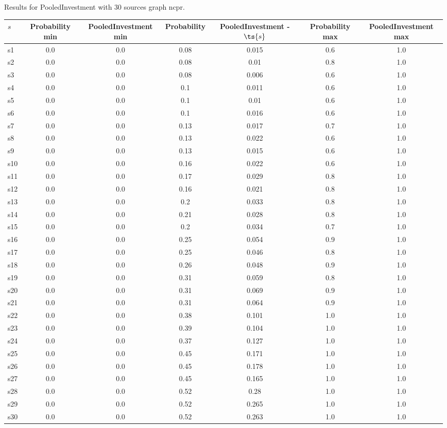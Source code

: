 \documentclass{article}
\begin{document}
\noindent Results for PooledInvestment with 30 sources graph ncpr.

\noindent\begin{tabular}{|l|c|c|c|c|c|c|}
\hline
$s$& Probability min & PooledInvestment min & Probability & PooledInvestment - $\ts{s}$ & Probability max & PooledInvestment max\\
\hline
s1 &0.0 & 0.0 & 0.08 & 0.015 & 0.6 & 1.0\\
\hline
s2 &0.0 & 0.0 & 0.08 & 0.01 & 0.8 & 1.0\\
\hline
s3 &0.0 & 0.0 & 0.08 & 0.006 & 0.6 & 1.0\\
\hline
s4 &0.0 & 0.0 & 0.1 & 0.011 & 0.6 & 1.0\\
\hline
s5 &0.0 & 0.0 & 0.1 & 0.01 & 0.6 & 1.0\\
\hline
s6 &0.0 & 0.0 & 0.1 & 0.016 & 0.6 & 1.0\\
\hline
s7 &0.0 & 0.0 & 0.13 & 0.017 & 0.7 & 1.0\\
\hline
s8 &0.0 & 0.0 & 0.13 & 0.022 & 0.6 & 1.0\\
\hline
s9 &0.0 & 0.0 & 0.13 & 0.015 & 0.6 & 1.0\\
\hline
s10 &0.0 & 0.0 & 0.16 & 0.022 & 0.6 & 1.0\\
\hline
s11 &0.0 & 0.0 & 0.17 & 0.029 & 0.8 & 1.0\\
\hline
s12 &0.0 & 0.0 & 0.16 & 0.021 & 0.8 & 1.0\\
\hline
s13 &0.0 & 0.0 & 0.2 & 0.033 & 0.8 & 1.0\\
\hline
s14 &0.0 & 0.0 & 0.21 & 0.028 & 0.8 & 1.0\\
\hline
s15 &0.0 & 0.0 & 0.2 & 0.034 & 0.7 & 1.0\\
\hline
s16 &0.0 & 0.0 & 0.25 & 0.054 & 0.9 & 1.0\\
\hline
s17 &0.0 & 0.0 & 0.25 & 0.046 & 0.8 & 1.0\\
\hline
s18 &0.0 & 0.0 & 0.26 & 0.048 & 0.9 & 1.0\\
\hline
s19 &0.0 & 0.0 & 0.31 & 0.059 & 0.8 & 1.0\\
\hline
s20 &0.0 & 0.0 & 0.31 & 0.069 & 0.9 & 1.0\\
\hline
s21 &0.0 & 0.0 & 0.31 & 0.064 & 0.9 & 1.0\\
\hline
s22 &0.0 & 0.0 & 0.38 & 0.101 & 1.0 & 1.0\\
\hline
s23 &0.0 & 0.0 & 0.39 & 0.104 & 1.0 & 1.0\\
\hline
s24 &0.0 & 0.0 & 0.37 & 0.127 & 1.0 & 1.0\\
\hline
s25 &0.0 & 0.0 & 0.45 & 0.171 & 1.0 & 1.0\\
\hline
s26 &0.0 & 0.0 & 0.45 & 0.178 & 1.0 & 1.0\\
\hline
s27 &0.0 & 0.0 & 0.45 & 0.165 & 1.0 & 1.0\\
\hline
s28 &0.0 & 0.0 & 0.52 & 0.28 & 1.0 & 1.0\\
\hline
s29 &0.0 & 0.0 & 0.52 & 0.265 & 1.0 & 1.0\\
\hline
s30 &0.0 & 0.0 & 0.52 & 0.263 & 1.0 & 1.0\\
\hline
\end{tabular}\\
\end{document}
